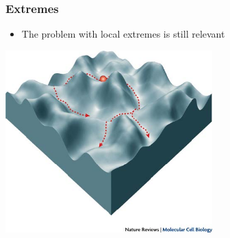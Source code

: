 \documentclass[default]{beamer}
\begin{document}
	\begin{frame}
		\frametitle{Extremes}
		
		\begin{itemize}
			\item The problem with local extremes is still relevant
		\end{itemize}
		
		\centering
		\includegraphics[width=0.6\textwidth]{linear_16.jpg}
	\end{frame}
\end{document}
